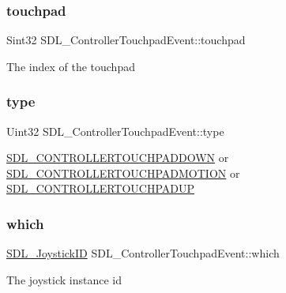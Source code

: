 \subsubsection{\texorpdfstring{touchpad}{touchpad}}
{\footnotesize\ttfamily Sint32 S\+D\+L\+\_\+\+Controller\+Touchpad\+Event\+::touchpad}

The index of the touchpad \mbox{\label{struct_s_d_l___controller_touchpad_event_ac33536046a3481953246b22a0371c109}} 
\subsubsection{\texorpdfstring{type}{type}}
{\footnotesize\ttfamily Uint32 S\+D\+L\+\_\+\+Controller\+Touchpad\+Event\+::type}

\mbox{\hyperlink{_s_d_l__events_8h_a3b589e89be6b35c02e0dd34a55f3fccaa156ec1564f07159355de8137bdab406d}{S\+D\+L\+\_\+\+C\+O\+N\+T\+R\+O\+L\+L\+E\+R\+T\+O\+U\+C\+H\+P\+A\+D\+D\+O\+WN}} or \mbox{\hyperlink{_s_d_l__events_8h_a3b589e89be6b35c02e0dd34a55f3fccaa6652ad594ff8306ded63b2e16a0d507f}{S\+D\+L\+\_\+\+C\+O\+N\+T\+R\+O\+L\+L\+E\+R\+T\+O\+U\+C\+H\+P\+A\+D\+M\+O\+T\+I\+ON}} or \mbox{\hyperlink{_s_d_l__events_8h_a3b589e89be6b35c02e0dd34a55f3fccaae94c3ab09ae94c2b83c386eae4e56810}{S\+D\+L\+\_\+\+C\+O\+N\+T\+R\+O\+L\+L\+E\+R\+T\+O\+U\+C\+H\+P\+A\+D\+UP}} \mbox{\label{struct_s_d_l___controller_touchpad_event_a0eccc1247f8924b2e495a2afd4f2daf4}} 
\subsubsection{\texorpdfstring{which}{which}}
{\footnotesize\ttfamily \mbox{\hyperlink{_s_d_l__joystick_8h_a3c3d32500cb08f76ee8077983912c0bd}{S\+D\+L\+\_\+\+Joystick\+ID}} S\+D\+L\+\_\+\+Controller\+Touchpad\+Event\+::which}

The joystick instance id \mbox{\label{struct_s_d_l___controller_touchpad_event_adb5d612ba132f5dc0278a27da9f2e310}} 
